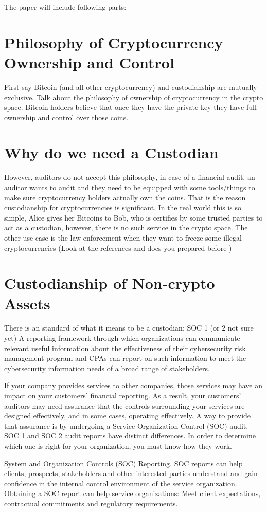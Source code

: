 
The paper will include following parts:
\section{Philosophy of Cryptocurrency Ownership and Control}
First say Bitcoin (and all other cryptocurrency) and custodianship are mutually exclusive. Talk about the philosophy of ownership of cryptocurrency in the crypto space.  Bitcoin holders believe that once they have the private key they have full ownership and control over those coins. 

\section{Why do we need a Custodian}
However, auditors do not accept this philosophy, in case of a financial audit, an auditor wants to audit and they need to be equipped with some tools/things to make sure cryptocurrency holders actually own the coins. That is the reason custodianship for cryptocurrencies is significant. In the real world this is so simple, Alice gives her Bitcoins to Bob, who is certifies by some trusted parties to act as a custodian, however, there is no such service in the crypto space. The other use-case is the law enforcement when they want to freeze some illegal cryptocurrencies (Look at the references and docs you prepared before )

\section{Custodianship of Non-crypto Assets}
There is an standard of what it means to be a custodian: SOC 1 (or 2 not sure yet)
A reporting framework through which organizations can communicate relevant useful information about the effectiveness of their cybersecurity risk management program and CPAs can report on such information to meet the cybersecurity information needs of a broad range of stakeholders. \par
If your company provides services to other companies, those services may have an impact on your customers’ financial reporting. As a result, your customers’ auditors may need assurance that the controls surrounding your services are designed effectively, and in some cases, operating effectively. A way to provide that assurance is by undergoing a Service Organization Control (SOC) audit. SOC 1 and SOC 2 audit reports have distinct differences. In order to determine which one is right for your organization, you must know how they work.
\par
System and Organization Controls (SOC) Reporting. SOC reports can help clients, prospects, stakeholders and other interested parties understand and gain confidence in the internal control environment of the service organization. Obtaining a SOC report can help service organizations: Meet client expectations, contractual commitments and regulatory requirements. 
 
